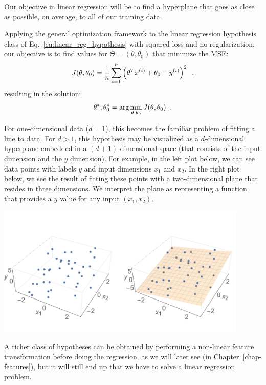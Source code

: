 Our objective in linear regression will be to find a hyperplane that
goes as close as possible, on average, to all of our training data.

Applying the general optimization framework to the linear regression
hypothesis class of
Eq.~\ref{eq:linear_reg_hypothesis} with squared loss and no regularization,
our objective is to find values for
$\Theta = (\theta, \theta_0)$ that minimize the MSE:
\begin{equation}
  J(\theta, \theta_0) = \frac{1}{n}\sum_{i =
    1}^n\left(\theta^Tx^{(i)} + \theta_0 - y^{(i)}\right)^2 \;\;,
  \label{eq:reg_mse_withconst}
\end{equation}
resulting in the solution:
\begin{equation}
  \theta^*, \theta_0^* = {\rm arg}\min_{\theta, \theta_0} J(\theta,
  \theta_0)\;\;.
  \label{olsObjective}
\end{equation}

For
one-dimensional data ($d=1$), this becomes the familiar problem of
fitting a line to data.  For $d>1$, this
hypothesis may be visualized as a $d$-dimensional hyperplane
embedded in a $(d+1)$-dimensional space (that consists of the input
dimension and the $y$ dimension).
For example, in the left plot
below, we can see data points with labels $y$ and input dimensions
$x_1$ and $x_2$. In the right plot below, we see the result of fitting
these points with a two-dimensional plane that resides in three
dimensions.  We interpret the plane as representing a function that
provides a $y$ value for any input $(x_1, x_2)$.

\includegraphics[width=0.9\textwidth]{figures/regression_ex1_plane1.png}

A richer class of hypotheses can be obtained by performing a
non-linear feature transformation before doing the regression, as
we will later see (in Chapter~\ref{chap-features}), but it will still
end up that we have to solve a linear regression problem.

